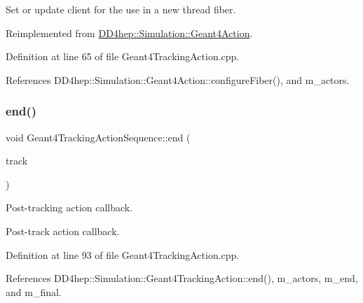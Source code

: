 Set or update client for the use in a new thread fiber. 



Reimplemented from \hyperlink{class_d_d4hep_1_1_simulation_1_1_geant4_action_a6adc7138508303e4e417cb48a737ab19}{D\+D4hep\+::\+Simulation\+::\+Geant4\+Action}.



Definition at line 65 of file Geant4\+Tracking\+Action.\+cpp.



References D\+D4hep\+::\+Simulation\+::\+Geant4\+Action\+::configure\+Fiber(), and m\+\_\+actors.

\hypertarget{class_d_d4hep_1_1_simulation_1_1_geant4_tracking_action_sequence_aeed70df4aa406595a03464436c52dce0}{}\label{class_d_d4hep_1_1_simulation_1_1_geant4_tracking_action_sequence_aeed70df4aa406595a03464436c52dce0} 
\subsubsection{\texorpdfstring{end()}{end()}}
{\footnotesize\ttfamily void Geant4\+Tracking\+Action\+Sequence\+::end (\begin{DoxyParamCaption}\item[{const G4\+Track $\ast$}]{track }\end{DoxyParamCaption})\hspace{0.3cm}{\ttfamily [virtual]}}



Post-\/tracking action callback. 

Post-\/track action callback. 

Definition at line 93 of file Geant4\+Tracking\+Action.\+cpp.



References D\+D4hep\+::\+Simulation\+::\+Geant4\+Tracking\+Action\+::end(), m\+\_\+actors, m\+\_\+end, and m\+\_\+final.

\hypertarget{class_d_d4hep_1_1_simulation_1_1_geant4_tracking_action_sequence_aa3c28c0e0ac499db301867e9d717f04d}{}\label{class_d_d4hep_1_1_simulation_1_1_geant4_tracking_action_sequence_aa3c28c0e0ac499db301867e9d717f04d} 
